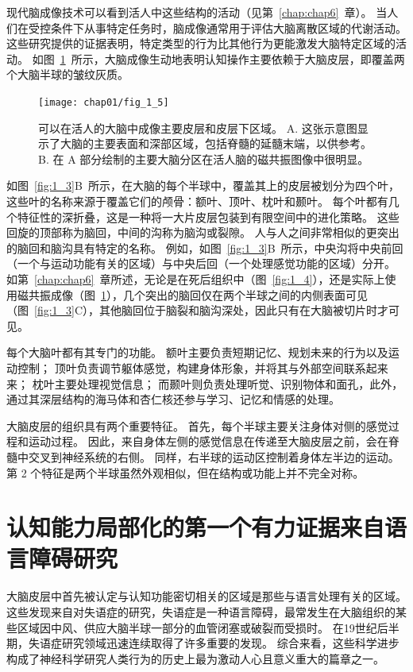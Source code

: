 现代脑成像技术可以看到活人中这些结构的活动（见第~\ref{chap:chap6}~章）。
当人们在受控条件下从事特定任务时，脑成像通常用于评估大脑离散区域的代谢活动。
这些研究提供的证据表明，特定类型的行为比其他行为更能激发大脑特定区域的活动。
如图~\ref{fig:1_5}~所示，大脑成像生动地表明认知操作主要依赖于大脑皮层，即覆盖两个大脑半球的皱纹灰质。


\begin{figure}[htbp]
	\centering
	\texttt{[image: chap01/fig\_1\_5]}
	\caption{可以在活人的大脑中成像主要皮层和皮层下区域。
		A. 这张示意图显示了大脑的主要表面和深部区域，包括脊髓的延髓末端，以供参考。
		B. 在 A 部分绘制的主要大脑分区在活人脑的磁共振图像中很明显。}
	\label{fig:1_5}
\end{figure}


如图~\ref{fig:1_3}B~所示，在大脑的每个半球中，覆盖其上的皮层被划分为四个叶，这些叶的名称来源于覆盖它们的颅骨：额叶、顶叶、枕叶和颞叶。
每个叶都有几个特征性的深折叠，这是一种将一大片皮层包装到有限空间中的进化策略。
这些回旋的顶部称为脑回，中间的沟称为脑沟或裂隙。 
人与人之间非常相似的更突出的脑回和脑沟具有特定的名称。
例如，如图~\ref{fig:1_3}B~所示，中央沟将中央前回（一个与运动功能有关的区域）与中央后回（一个处理感觉功能的区域）分开。
如第~\ref{chap:chap6}~章所述，无论是在死后组织中（图~\ref{fig:1_4}），还是实际上使用磁共振成像（图~\ref{fig:1_5}），几个突出的脑回仅在两个半球之间的内侧表面可见（图~\ref{fig:1_3}C），其他脑回位于脑裂和脑沟深处，因此只有在大脑被切片时才可见。


每个大脑叶都有其专门的功能。
额叶主要负责短期记忆、规划未来的行为以及运动控制；
顶叶负责调节躯体感觉，构建身体形象，并将其与外部空间联系起来来；
枕叶主要处理视觉信息；
而颞叶则负责处理听觉、识别物体和面孔，此外，通过其深层结构的海马体和杏仁核还参与学习、记忆和情感的处理。


大脑皮层的组织具有两个重要特征。
首先，每个半球主要关注身体对侧的感觉过程和运动过程。
因此，来自身体左侧的感觉信息在传递至大脑皮层之前，会在脊髓中交叉到神经系统的右侧。
同样，右半球的运动区控制着身体左半边的运动。
第 2 个特征是两个半球虽然外观相似，但在结构或功能上并不完全对称。



\section{认知能力局部化的第一个有力证据来自语言障碍研究}


大脑皮层中首先被认定与认知功能密切相关的区域是那些与语言处理有关的区域。
这些发现来自对失语症的研究，失语症是一种语言障碍，最常发生在大脑组织的某些区域因中风、供应大脑半球一部分的血管闭塞或破裂而受损时。
在19世纪后半期，失语症研究领域迅速连续取得了许多重要的发现。
综合来看，这些科学进步构成了神经科学研究人类行为的历史上最为激动人心且意义重大的篇章之一。


